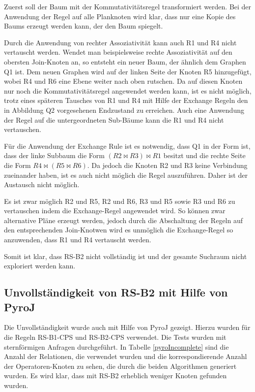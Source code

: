 Zuerst soll der Baum mit der Kommutativitätsregel transformiert werden. Bei der Anwendung der Regel auf alle Planknoten wird klar, dass nur eine Kopie des Baums erzeugt werden kann, der den Baum spiegelt.

Durch die Anwendung von rechter Assoziativität kann auch R1 und R4 nicht vertauscht werden. Wendet man beispielsweise rechte Assoziativität auf den obersten Join-Knoten an, so entsteht ein neuer Baum, der ähnlich dem Graphen Q1 ist. Dem neuen Graphen wird auf der linken Seite der Knoten R5 hinzugefügt, wobei R4 und R6 eine Ebene weiter nach oben rutschen. Da auf diesen Knoten nur noch die Kommutativitätsregel angewendet werden kann, ist es nicht möglich, trotz eines späteren Tausches von R1 und R4 mit Hilfe der Exchange Regeln den in Abbildung Q2 vorgesehenen Endzustand zu erreichen. Auch eine Anwendung der Regel auf die untergeordneten Sub-Bäume kann die R1 und R4 nicht vertauschen.

Für die Anwendung der Exchange Rule ist es notwendig, dass Q1 in der Form ist, dass der linke Subbaum die Form $(R2 \Join R3) \Join R1$ besitzt und die rechte Seite die Form $R4 \Join (R5 \Join R6)$. Da jedoch die Knoten R2 und R3 keine Verbindung zueinander haben, ist es auch nicht möglich die Regel auszuführen. Daher ist der Austausch nicht möglich.

Es ist zwar möglich R2 und R5, R2 und R6, R3 und R5 sowie R3 und R6 zu vertauschen indem die Exchange-Regel angewendet wird. So können zwar alternative Pläne erzeugt werden, jedoch durch die Abschaltung der Regeln auf den entsprechenden Join-Knotwen wird es unmöglich die Exchange-Regel so anzuwenden, dass R1 und R4 vertauscht werden.


Somit ist klar, dass RS-B2 nicht vollständig ist und der gesamte Suchraum nicht exploriert werden kann.





\subsection{Unvollständigkeit von RS-B2 mit Hilfe von PyroJ}

Die Unvollständigkeit wurde auch mit Hilfe von PyroJ gezeigt. Hierzu wurden für die Regeln RS-B1-CPS und RS-B2-CPS verwendet. Die Tests wurden mit sternförmigen Anfragen durchgeführt. In Tabelle \ref{pyroIncomplete} sind die Anzahl der Relationen, die verwendet wurden und die korrespondierende Anzahl der Operatoren-Knoten zu sehen, die durch die beiden Algorithmen generiert wurden. Es wird klar, dass mit RS-B2 erheblich weniger Knoten gefunden wurden. 

